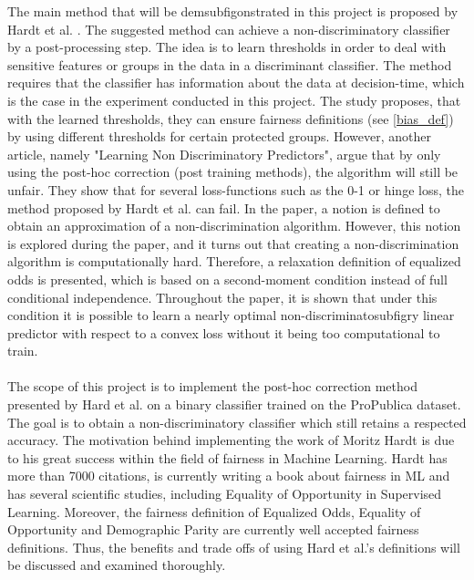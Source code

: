 \documentclass[11pt, fleqn, titlepage]{article}
\begin{document}
	\noindent The main method that will be demsubfigonstrated in this project is proposed by Hardt et al. \cite{equal_of_oppor}. The suggested method can achieve a non-discriminatory classifier by a post-processing step. The idea is to learn thresholds in order to deal with sensitive features or groups in the data in a discriminant classifier. The method requires that the classifier has information about the data at decision-time, which is the case in the experiment conducted in this project. The study proposes, that with the learned thresholds, they can ensure fairness definitions (see \ref{bias_def}) by using different thresholds for certain protected groups. However, another article, namely "Learning Non Discriminatory Predictors", argue that by only using the post-hoc correction (post training methods), the algorithm will still be unfair. \cite{b_woodworth} They show that for several loss-functions such as the 0-1 or hinge loss, the method proposed by Hardt et al. \cite{equal_of_oppor} can fail. In the paper, a notion is defined to obtain an approximation of a non-discrimination algorithm. However, this notion is explored during the paper, and it turns out that creating a non-discrimination algorithm is computationally hard. Therefore, a relaxation definition of equalized odds is presented, which is based on a second-moment condition instead of full conditional independence. Throughout the paper, it is shown that under this condition it is possible to learn a nearly optimal non-discriminatosubfigry linear predictor with respect to a convex loss without it being too computational to train. \cite{b_woodworth}\\\\
	 The scope of this project is to implement the post-hoc correction method presented by Hard et al. \cite{equal_of_oppor} on a binary classifier trained on the ProPublica dataset. The goal is to obtain a non-discriminatory classifier which still retains a respected accuracy. The motivation behind implementing the work of Moritz Hardt is due to his great success within the field of fairness in Machine Learning. Hardt has more than 7000 citations, is currently writing a book about fairness in ML and has several scientific studies, including Equality of Opportunity in Supervised Learning. Moreover, the fairness definition of Equalized Odds, Equality of Opportunity and Demographic Parity are currently well accepted fairness definitions. Thus, the benefits and trade offs of using Hard et al.'s definitions will be discussed and examined thoroughly.
	
\end{document}
